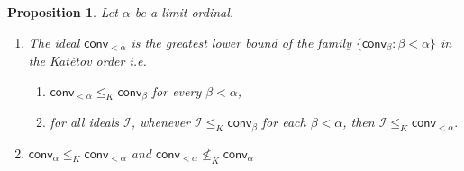 \documentclass{amsart}
\theoremstyle{plain}
\newtheorem{proposition}[theorem]{Proposition}
\theoremstyle{definition}
\theoremstyle{remark}
\newcommand{\cI}{\mathcal{I}}
\newcommand{\I}{\cI}
\newcommand{\conv}{\mathsf{conv}}
\begin{document}
\begin{proposition}
Let $\alpha$ be a  limit ordinal.
    \begin{enumerate}
        \item The ideal $\conv_{<\alpha}$ is the greatest lower bound of the family $\{\conv_\beta : \beta <\alpha\}$ in the Kat\v{e}tov order i.e.
            \begin{enumerate}
\item  $ \conv_{<\alpha}\leq_K \conv_\beta$ for every $\beta<\alpha$,

 \item 
 for all ideals $\I$, whenever  $\I\leq_K\conv_\beta$ for each $\beta<\alpha$, then $\I\leq_K \conv_{<\alpha}.$
           \end{enumerate}

        \item 
        $\conv_\alpha\leq_K\conv_{<\alpha}$
        and 
      $\conv_{<\alpha}\nleq_K \conv_\alpha$
    
    \end{enumerate}
\end{proposition}
\end{document}
